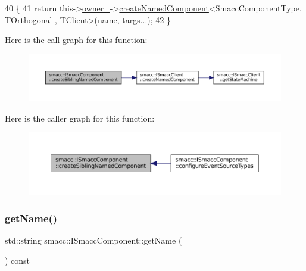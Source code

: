 \begin{DoxyCode}
40     \{
41         \textcolor{keywordflow}{return} this->\hyperlink{classsmacc_1_1ISmaccComponent_a909590e672450ce0eb0d8facb45c737a}{owner\_}->\hyperlink{classsmacc_1_1ISmaccClient_affcc2f95bc993b5f07ef0d6ab6eec8f1}{createNamedComponent}<SmaccComponentType, TOrthogonal
      , \hyperlink{classTClient}{TClient}>(name, targs...);
42     \}
\end{DoxyCode}
Here is the call graph for this function\+:
\nopagebreak
\begin{figure}[H]
\begin{center}
\leavevmode
\includegraphics[width=350pt]{classsmacc_1_1ISmaccComponent_a86afd97c9eaed89073def7c51a3c86ab_cgraph}
\end{center}
\end{figure}
Here is the caller graph for this function\+:
\nopagebreak
\begin{figure}[H]
\begin{center}
\leavevmode
\includegraphics[width=350pt]{classsmacc_1_1ISmaccComponent_a86afd97c9eaed89073def7c51a3c86ab_icgraph}
\end{center}
\end{figure}
\mbox{\label{classsmacc_1_1ISmaccComponent_a8bfa94b1b1c616d55837ebba1b426c6e}} 
\subsubsection{\texorpdfstring{get\+Name()}{getName()}}
{\footnotesize\ttfamily std\+::string smacc\+::\+I\+Smacc\+Component\+::get\+Name (\begin{DoxyParamCaption}{ }\end{DoxyParamCaption}) const\hspace{0.3cm}{\ttfamily [virtual]}}



